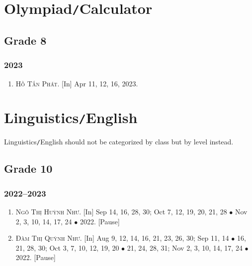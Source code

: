 \documentclass{article}
\begin{document}

\section{Olympiad\texttt{/}Calculator}

\subsection{Grade 8}

\subsubsection{2023}

\begin{enumerate}
	\item \textsc{Hồ Tấn Phát.} \textsf{[In]} Apr 11, 12, 16, 2023.
\end{enumerate}


\section{Linguistics\texttt{/}English}
Linguistics\texttt{/}English should not be categorized by class but by level instead.

\subsection{Grade 10}

\subsubsection{2022--2023}

\begin{enumerate}
	\item \textsc{Ngô Thị Huỳnh Như.} \textsf{[In]} Sep 14, 16, 28, 30; Oct 7, 12, 19, 20, 21, 28 $\bullet$ Nov 2, 3, 10, 14, 17, 24 $\bullet$ 2022. \textsf{[Pause]}
	\item \textsc{Đàm Thị Quỳnh Như.} \textsf{[In]} Aug 9, 12, 14, 16, 21, 23, 26, 30; Sep 11, 14 $\bullet$ 16, 21, 28, 30; Oct 3, 7, 10, 12, 19, 20 $\bullet$ 21, 24, 28, 31; Nov 2, 3, 10, 14, 17, 24 $\bullet$ 2022. \textsf{[Pause]}
\end{enumerate}


\printbibliography[heading=bibintoc]
	
\end{document}
